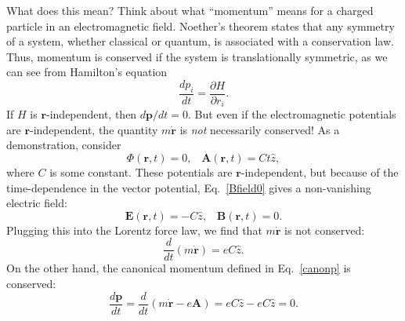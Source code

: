 \documentclass[prx,12pt]{revtex4-2}
\begin{document}
What does this mean?  Think about what ``momentum'' means for a
charged particle in an electromagnetic field.  Noether's theorem
states that any symmetry of a system, whether classical or quantum, is
associated with a conservation law.  Thus, momentum is conserved if
the system is translationally symmetric, as we can see from Hamilton's
equation
\begin{equation*}
  \frac{dp_i}{dt} = \frac{\partial H}{\partial r_i}.
\end{equation*}
If $H$ is $\mathbf{r}$-independent, then $d\mathbf{p}/dt = 0$.  But
even if the electromagnetic potentials are $\mathbf{r}$-independent,
the quantity $m\dot{\mathbf{r}}$ is \textit{not} necessarily
conserved!  As a demonstration, consider
\begin{equation}
  \Phi(\mathbf{r}, t) = 0, \;\;\; \mathbf{A}(\mathbf{r}, t) = Ct \hat{z},
\end{equation}
where $C$ is some constant.  These potentials are
$\mathbf{r}$-independent, but because of the time-dependence in the
vector potential, Eq.~\eqref{Bfield0} gives a non-vanishing electric
field:
\begin{equation}
  \mathbf{E}(\mathbf{r},t) = - C\hat{z}, \;\;\;\mathbf{B}(\mathbf{r},t) = 0.
\end{equation}
Plugging this into the Lorentz force law, we find that
$m\dot{\mathbf{r}}$ is not conserved:
\begin{equation}
  \frac{d}{dt}(m\dot{\mathbf{r}}) = eC\hat{z}.
\end{equation}
On the other hand, the canonical momentum defined in
Eq.~\eqref{canonp} is conserved:
\begin{equation}
  \frac{d\mathbf{p}}{dt} =
  \frac{d}{dt}(m\dot{\mathbf{r}} - e\mathbf{A}) =
  eC\hat{z} - eC\hat{z} = 0.
\end{equation}
\end{document}
